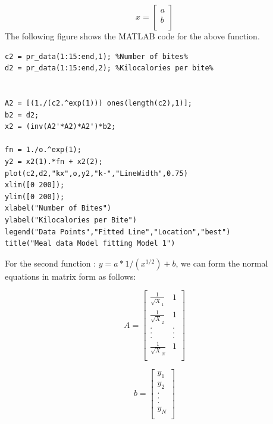 \documentclass{article}
\begin{document}
\begin{equation}
x=
\begin{bmatrix}
a\\b\\
\end{bmatrix}
\end{equation}
The following figure shows the MATLAB code for the above function.\\
\begin{lstlisting}[frame=single]
c2 = pr_data(1:15:end,1); %Number of bites%
d2 = pr_data(1:15:end,2); %Kilocalories per bite%


A2 = [(1./(c2.^exp(1))) ones(length(c2),1)];
b2 = d2;
x2 = (inv(A2'*A2)*A2')*b2;

fn = 1./o.^exp(1);
y2 = x2(1).*fn + x2(2);
plot(c2,d2,"kx",o,y2,"k-","LineWidth",0.75)
xlim([0 200]);
ylim([0 200]);
xlabel("Number of Bites")
ylabel("Kilocalories per Bite")
legend("Data Points","Fitted Line","Location","best")
title("Meal data Model fitting Model 1")
\end{lstlisting}

For the second function : $y=a*1/(x^{1/2}) + b$, we can form the normal equations in matrix form as follows:

\begin{equation}
A=
\begin{bmatrix}
\frac{1}{\sqrt X_1}&1\\
\frac{1}{\sqrt X_2}&1\\
.&.\\
.&.\\
.&.\\
\frac{1}{\sqrt X_N}&1\\
\end{bmatrix}
\end{equation}

\begin{equation}
b=
\begin{bmatrix}
y_1\\
y_2\\
.\\
.\\
.\\
y_N\\
\end{bmatrix}
\end{equation}
\end{document}
